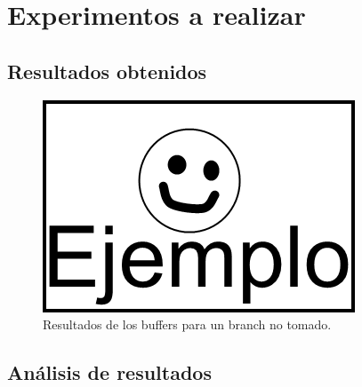 \section{Experimentos a realizar}


\subsection{Resultados obtenidos}
\noindent
\begin{figure}[!ht]
	\centering
	\includegraphics[scale=0.5]{images/Ejemplo.png}
	\caption{Resultados de los buffers para un branch no tomado.}
	\label{fig:ej}
\end{figure}



\subsection{Análisis de resultados}
